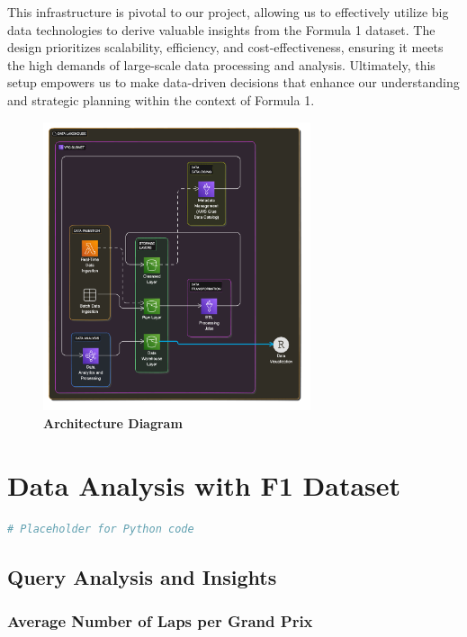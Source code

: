 \documentclass{article}
\begin{document}
This infrastructure is pivotal to our project, allowing us to effectively utilize big data technologies to derive valuable insights from the Formula 1 dataset. The design prioritizes scalability, efficiency, and cost-effectiveness, ensuring it meets the high demands of large-scale data processing and analysis. Ultimately, this setup empowers us to make data-driven decisions that enhance our understanding and strategic planning within the context of Formula 1.

\begin{figure}[H]
    \centering
    \includegraphics[width=0.7\textwidth]{images/arch/AWS-GridGuru-LakeHouseArchitecture.png}
    \caption{\textbf{Architecture Diagram}}
\end{figure}

\section{Data Analysis with F1 Dataset}

\begin{lstlisting}[language=Python]
# Placeholder for Python code
\end{lstlisting}

\subsection{Query Analysis and Insights}

\subsubsection{Average Number of Laps per Grand Prix}
\end{document}

